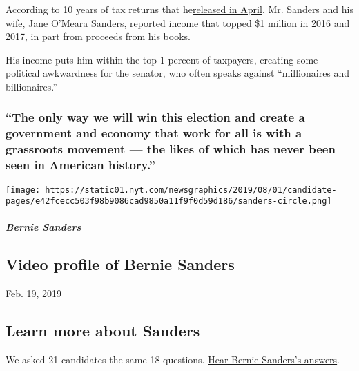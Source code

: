 According to 10 years of tax returns that
he\href{https://www.nytimes.com/2019/04/15/us/politics/bernie-sanders-taxes.html}{}\href{https://www.nytimes.com/2019/04/15/us/politics/bernie-sanders-taxes.html}{released
in April}, Mr. Sanders and his wife, Jane O'Meara Sanders, reported
income that topped \$1 million in 2016 and 2017, in part from proceeds
from his books.

His income puts him within the top 1 percent of taxpayers, creating some
political awkwardness for the senator, who often speaks against
``millionaires and billionaires.''

\hypertarget{the-only-way-we-will-win-this-election-and-create-a-government-and-economy-that-work-for-all-is-with-a-grassroots-movement--the-likes-of-which-has-never-been-seen-in-american-history}{%
\subsubsection{``The only way we will win this election and create a
government and economy that work for all is with a grassroots movement
--- the likes of which has never been seen in American
history.''}\label{the-only-way-we-will-win-this-election-and-create-a-government-and-economy-that-work-for-all-is-with-a-grassroots-movement--the-likes-of-which-has-never-been-seen-in-american-history}}

\texttt{[image: https://static01.nyt.com/newsgraphics/2019/08/01/candidate-pages/e42fcecc503f98b9086cad9850a11f9f0d59d186/sanders-circle.png]}

\hypertarget{bernie-sanders-1}{%
\subparagraph{Bernie Sanders}\label{bernie-sanders-1}}

\hypertarget{video-profile-of-bernie-sanders}{%
\subsection{Video profile of Bernie
Sanders}\label{video-profile-of-bernie-sanders}}

Feb. 19, 2019

\hypertarget{learn-more-about-sanders}{%
\subsection{Learn more about Sanders}\label{learn-more-about-sanders}}

We asked 21 candidates the same 18 questions.
\href{https://www.nytimes.com/interactive/2019/us/politics/bernie-sanders-2020-campaign.html}{Hear
Bernie Sanders's answers}.

